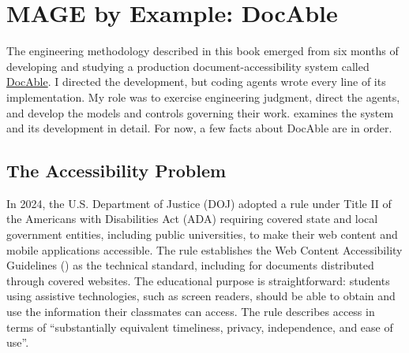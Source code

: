 


\chapter{MAGE by Example: DocAble}


The engineering methodology described in this book emerged from six months of developing and studying a production document-accessibility system called \href{\%7B\%7Bproduct_url\%7D\%7D}{DocAble}. I directed the development, but coding agents wrote every line of its implementation. My role was to exercise engineering judgment, direct the agents, and develop the models and controls governing their work.  examines the system and its development in detail. For now, a few facts about DocAble are in order.

\section{The Accessibility Problem}\label{heading:the-accessibility-problem}



In 2024, the U.S. Department of Justice (DOJ) adopted a rule under Title II of the Americans with Disabilities Act (ADA) requiring covered state and local government entities, including public universities, to make their web content and mobile applications accessible. The rule establishes the Web Content Accessibility Guidelines () as the technical standard, including for documents distributed through covered websites. The educational purpose is straightforward: students using assistive technologies, such as screen readers, should be able to obtain and use the information their classmates can access. The rule describes access in terms of ``substantially equivalent timeliness, privacy, independence, and ease of use''\citep{doj-web-accessibility-2024}.

